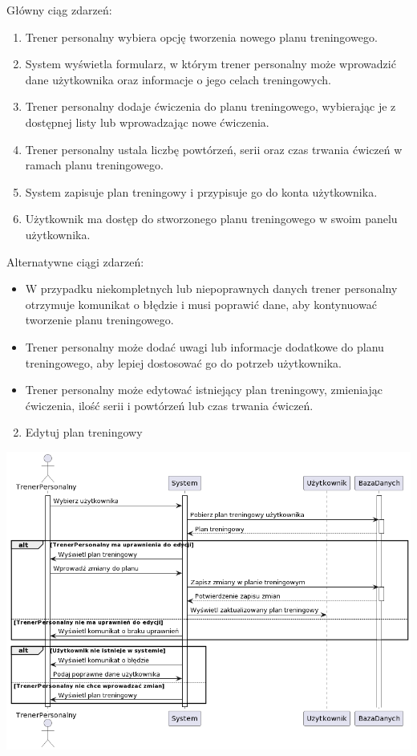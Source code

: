 \documentclass[
]{article}
\providecommand{\tightlist}{%
  \setlength{\itemsep}{0pt}\setlength{\parskip}{0pt}}
\begin{document}
{Główny ciąg zdarzeń:}

\begin{enumerate}
\tightlist
\item
  {Trener personalny wybiera opcję tworzenia nowego planu treningowego.}
\item
  {System wyświetla formularz, w którym trener personalny może
  wprowadzić dane użytkownika oraz informacje o jego celach
  treningowych.}
\item
  {Trener personalny dodaje ćwiczenia do planu treningowego, wybierając
  je z dostępnej listy lub wprowadzając nowe ćwiczenia.}
\item
  {Trener personalny ustala liczbę powtórzeń, serii oraz czas trwania
  ćwiczeń w ramach planu treningowego.}
\item
  {System zapisuje plan treningowy i przypisuje go do konta
  użytkownika.}
\item
  {Użytkownik ma dostęp do stworzonego planu treningowego w swoim panelu
  użytkownika.}
\end{enumerate}

{Alternatywne ciągi zdarzeń:}

\begin{itemize}
\tightlist
\item
  {W przypadku niekompletnych lub niepoprawnych danych trener personalny
  otrzymuje komunikat o błędzie i musi poprawić dane, aby kontynuować
  tworzenie planu treningowego.}
\item
  {Trener personalny może dodać uwagi lub informacje dodatkowe do planu
  treningowego, aby lepiej dostosować go do potrzeb użytkownika.}
\item
  {Trener personalny może edytować istniejący plan treningowy,
  zmieniając ćwiczenia, ilość serii i powtórzeń lub czas trwania
  ćwiczeń.}
\end{itemize}

{}

\begin{enumerate}
\setcounter{enumi}{1}
\tightlist
\item
  {Edytuj plan treningowy}
\end{enumerate}

{\includegraphics{diagrams/sequence/edycja_planu_treningowego.png}}
\end{document}
